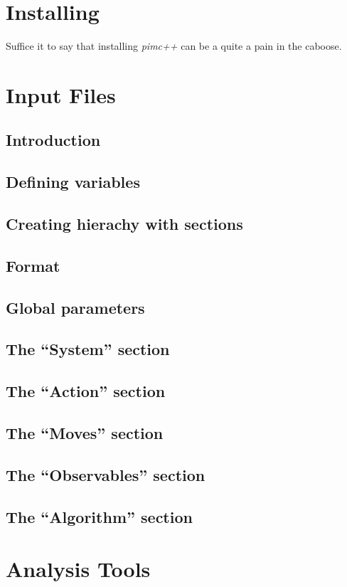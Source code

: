 \documentclass{book}
\begin{document}
\chapter{Installing}
Suffice it to say that installing {\em pimc++} can be a quite a pain
in the caboose.

\chapter{Input Files}
\section{Introduction}
\section{Defining variables}
\section{Creating hierachy with sections}

\section{Format}
\section{Global parameters}
\section{The ``System'' section}
\section{The ``Action'' section}
\section{The ``Moves'' section}
\section{The ``Observables'' section}
\section{The ``Algorithm'' section}

\chapter{Analysis Tools}
\end{document}
